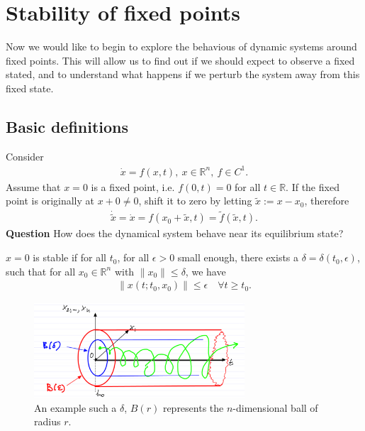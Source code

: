 \chapter{Stability of fixed points}
Now we would like to begin to explore the behavious of dynamic systems around fixed points. This will allow us to find out if we should expect to observe a fixed stated, and to understand what happens if we perturb the system away from this fixed state.
\section{Basic definitions}
Consider
\begin{align}
	\dot{x}=f(x,t),\ x \in \mathbb{R}^{n},\ f\in C^{1}.
\end{align}
Assume that $x=0$ is a fixed point, i.e. $f(0,t) = 0$ for all $t \in \mathbb{R}$. If the fixed point is originally at $x+0\neq 0$, shift it to zero by letting $\tilde{x}:=x-x_0$, therefore 
\begin{align}
	\dot{\tilde{x}} = \dot{x} = f(x_0 + \tilde{x}, t) = \tilde{f}(\tilde{x}, t).
\end{align}
\textbf{Question} How does the dynamical system behave near its equilibrium state?

\begin{definition}
	$x=0$ is stable if for all $t_0$, for all $\epsilon>0$ small enough, there exists a $\delta=\delta(t_0, \epsilon)$, such that for all $x_0 \in \mathbb{R}^{n}$ with $\|x_0\| \leq \delta$, we have 
	\begin{align}
		\left \| x(t;t_0, x_0) \right\| \leq \epsilon \quad \forall t \geq t_0.
	\end{align}
\begin{figure}[h]
	\centering
	\includegraphics[width=0.7\textwidth]{figures/ch2/1lyapunov_stability.png}
	\caption{An example such a $\delta$, $B(r)$ represents the $n$-dimensional ball of radius $r$.}
\end{figure}
\end{definition}

